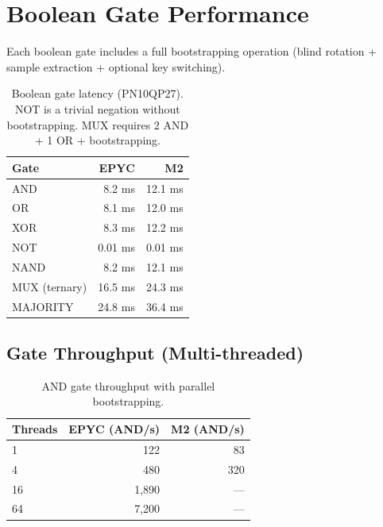 \section{Boolean Gate Performance}


Each boolean gate includes a full bootstrapping operation (blind rotation + sample extraction + optional key switching).

\begin{table}[h]
\centering
\begin{tabular}{@{}lrr@{}}
\toprule
\textbf{Gate} & \textbf{EPYC} & \textbf{M2} \\
\midrule
AND & 8.2 ms & 12.1 ms \\
OR & 8.1 ms & 12.0 ms \\
XOR & 8.3 ms & 12.2 ms \\
NOT & 0.01 ms & 0.01 ms \\
NAND & 8.2 ms & 12.1 ms \\
MUX (ternary) & 16.5 ms & 24.3 ms \\
MAJORITY & 24.8 ms & 36.4 ms \\
\bottomrule
\end{tabular}
\caption{Boolean gate latency (PN10QP27). NOT is a trivial negation without bootstrapping. MUX requires 2 AND + 1 OR + bootstrapping.}
\label{tab:gates}
\end{table}

\subsection{Gate Throughput (Multi-threaded)}

\begin{table}[h]
\centering
\begin{tabular}{@{}lrr@{}}
\toprule
\textbf{Threads} & \textbf{EPYC (AND/s)} & \textbf{M2 (AND/s)} \\
\midrule
1 & 122 & 83 \\
4 & 480 & 320 \\
16 & 1,890 & --- \\
64 & 7,200 & --- \\
\bottomrule
\end{tabular}
\caption{AND gate throughput with parallel bootstrapping.}
\label{tab:gate-throughput}
\end{table}


